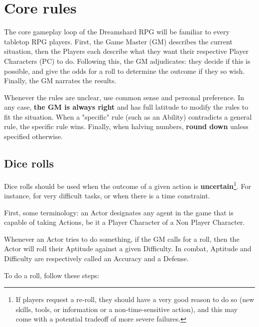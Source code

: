 \chapter{Core rules}

The core gameplay loop of the Dreamshard RPG will be familiar to every tabletop RPG players. First, the Game Master (GM) describes the current situation, then the Players each describe what they want their respective Player Characters (PC) to do. Following this, the GM adjudicates: they decide if this is possible, and give the odds for a roll to determine the outcome if they so wish. Finally, the GM narrates the results. 

Whenever the rules are unclear, use common sense and personal preference. In any case, \textbf{the GM is always right} and has full latitude to modify the rules to fit the situation. When a "specific" rule (such as an Ability) contradicts a general rule, the specific rule wins. Finally, when halving numbers, \textbf{round down} unless specified otherwise. 


\section{Dice rolls}
\label{dice_rolls}

Dice rolls should be used when the outcome of a given action is \textbf{uncertain}\footnote{If players request a re-roll, they should have a very good reason to do so (new skills, tools, or information or a non-time-sensitive action), and this may come with a potential tradeoff of more severe failures.}. For instance, for very difficult tasks, or when there is a time constraint.

First, some terminology: an Actor designates any agent in the game that is capable of taking Actions, be it a Player Character of a Non Player Character.

Whenever an Actor tries to do something, if the GM calls for a roll, then the Actor will roll their Aptitude against a given Difficulty. In combat, Aptitude and Difficulty are respectively called an Accuracy and a Defense.

To do a roll, follow these steps:

